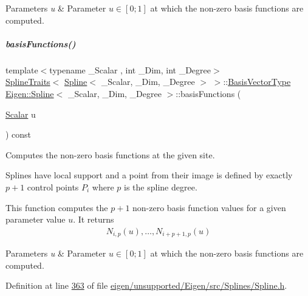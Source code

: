 \begin{DoxyParams}{Parameters}
{\em u} & Parameter $u \in [0;1]$ at which the non-\/zero basis functions are computed. \\
\hline
\end{DoxyParams}
\mbox{\label{group___splines___module_afe0997f0bb02a3fac3073016abac04c6}} 
\subparagraph{\texorpdfstring{basis\+Functions()}{basisFunctions()}\hspace{0.1cm}{\footnotesize\ttfamily [2/2]}}
{\footnotesize\ttfamily template$<$typename \+\_\+\+Scalar , int \+\_\+\+Dim, int \+\_\+\+Degree$>$ \\
\hyperlink{struct_eigen_1_1_spline_traits}{Spline\+Traits}$<$ \hyperlink{group___splines___module_class_eigen_1_1_spline}{Spline}$<$ \+\_\+\+Scalar, \+\_\+\+Dim, \+\_\+\+Degree $>$ $>$\+::\hyperlink{group___splines___module_a1d49cef942ea59d85d1711ee32354e6b}{Basis\+Vector\+Type} \hyperlink{group___splines___module_class_eigen_1_1_spline}{Eigen\+::\+Spline}$<$ \+\_\+\+Scalar, \+\_\+\+Dim, \+\_\+\+Degree $>$\+::basis\+Functions (\begin{DoxyParamCaption}\item[{\hyperlink{group___splines___module_a8cafd78b564825c76fbb3419653d9742}{Scalar}}]{u }\end{DoxyParamCaption}) const}



Computes the non-\/zero basis functions at the given site. 

Splines have local support and a point from their image is defined by exactly $p+1$ control points $P_i$ where $p$ is the spline degree.

This function computes the $p+1$ non-\/zero basis function values for a given parameter value $u$. It returns \begin{align*} N_{i,p}(u), \hdots, N_{i+p+1,p}(u) \end{align*}


\begin{DoxyParams}{Parameters}
{\em u} & Parameter $u \in [0;1]$ at which the non-\/zero basis functions are computed. \\
\hline
\end{DoxyParams}


Definition at line \hyperlink{eigen_2unsupported_2_eigen_2src_2_splines_2_spline_8h_source_l00363}{363} of file \hyperlink{eigen_2unsupported_2_eigen_2src_2_splines_2_spline_8h_source}{eigen/unsupported/\+Eigen/src/\+Splines/\+Spline.\+h}.

